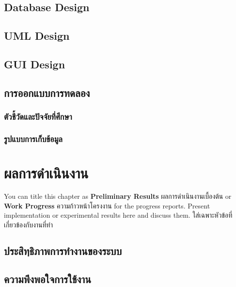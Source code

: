 \documentclass[12pt,oneside,openright,a4paper]{explo-thai-project}
\begin{document}
\section{Database Design}

\section{UML Design}

\section{GUI Design}

\section{การออกแบบการทดลอง}
\subsection{ตัวชี้วัดและปัจจัยที่ศึกษา}
\subsection{รูปแบบการเก็บข้อมูล}





\chapter{ผลการดำเนินงาน}

You can title this chapter as \textbf{Preliminary Results} ผลการดำเนินงานเบื้องต้น or \textbf{Work Progress} ความก้าวหน้าโครงงาน for the progress reports. Present implementation or experimental results here and discuss them.
ใส่เฉพาะหัวข้อที่เกี่ยวข้องกับงานที่ทำ 

\section{ประสิทฺธิภาพการทำงานของระบบ} 
\section{ความพึงพอใจการใช้งาน}
\end{document}

